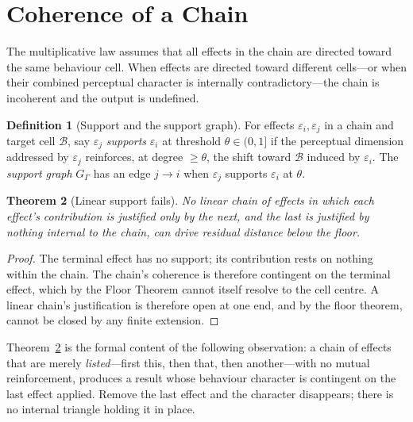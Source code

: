 \documentclass[twocolumn,11pt,a4paper]{article}
\theoremstyle{mee}
\newtheorem{theorem}{Theorem}[section]
\theoremstyle{definition}
\newtheorem{definition}[theorem]{Definition}
\theoremstyle{remark}
\newcommand{\BState}{\mathcal{B}}
\newcommand{\Eff}{\varepsilon}
\newcommand{\Chain}{\Gamma}
\begin{document}
\section{Coherence of a Chain}
\label{sec:coherence}

The multiplicative law assumes that all effects in the chain are directed
toward the same behaviour cell. When effects are directed toward different
cells---or when their combined perceptual character is internally
contradictory---the chain is incoherent and the output is undefined.

\begin{definition}[Support and the support graph]
\label{def:support}
For effects $\Eff_i,\Eff_j$ in a chain and target cell $\BState$, say
$\Eff_j$ \emph{supports} $\Eff_i$ at threshold $\theta\in(0,1]$ if the
perceptual dimension addressed by $\Eff_j$ reinforces, at degree
$\ge\theta$, the shift toward $\BState$ induced by $\Eff_i$. The
\emph{support graph} $G_\Chain$ has an edge $j\to i$ when $\Eff_j$
supports $\Eff_i$ at $\theta$.
\end{definition}

\begin{theorem}[Linear support fails]
\label{thm:linear}
No linear chain of effects in which each effect's contribution is
justified only by the next, and the last is justified by nothing internal
to the chain, can drive residual distance below the floor.
\end{theorem}

\begin{proof}
The terminal effect has no support; its contribution rests on nothing
within the chain. The chain's coherence is therefore contingent on the
terminal effect, which by the Floor Theorem cannot itself resolve to the
cell centre. A linear chain's justification is therefore open at one end,
and by the floor theorem, cannot be closed by any finite extension.
\end{proof}

Theorem~\ref{thm:linear} is the formal content of the following
observation: a chain of effects that are merely \emph{listed}---first
this, then that, then another---with no mutual reinforcement, produces a
result whose behaviour character is contingent on the last effect applied.
Remove the last effect and the character disappears; there is no internal
triangle holding it in place.
\end{document}
